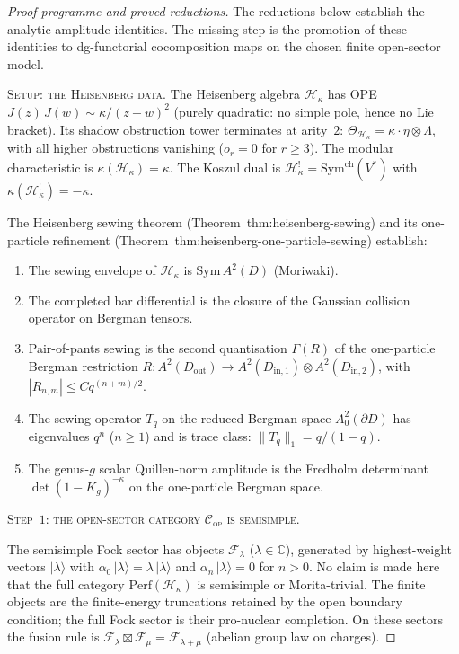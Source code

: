 \documentclass[11pt]{article}
\newcommand{\cC}{\mathcal{C}}
\newcommand{\cH}{\mathcal{H}}
\newcommand{\C}{\mathbb{C}}
\newcommand{\cF}{\mathcal{F}}
\begin{document}
\begin{proof}[Proof programme and proved reductions]
The reductions below establish the analytic amplitude identities.
The missing step is the promotion of these identities to
dg-functorial cocomposition maps on the chosen finite open-sector
model.

\medskip
\noindent\textsc{Setup: the Heisenberg data.}
The Heisenberg algebra $\cH_\kappa$ has OPE
$J(z)\,J(w) \sim \kappa/(z-w)^2$ (purely quadratic: no
simple pole, hence no Lie bracket).  Its shadow obstruction
tower terminates at arity~$2$:
$\Theta_{\cH_\kappa} = \kappa \cdot \eta \otimes \Lambda$,
with all higher obstructions vanishing ($o_r = 0$ for
$r \geq 3$).  The modular characteristic is
$\kappa(\cH_\kappa) = \kappa$.  The Koszul dual is
$\cH_\kappa^! = \mathrm{Sym}^{\mathrm{ch}}(V^*)$ with
$\kappa(\cH_\kappa^!) = -\kappa$.

The Heisenberg sewing theorem
(Theorem~\textup{thm:heisenberg-sewing}) and its
one-particle refinement
(Theorem~\textup{thm:heisenberg-one-particle-sewing})
establish:
\begin{enumerate}[label=\textup{(S\arabic*)},nosep]
\item The sewing envelope of $\cH_\kappa$ is
  $\mathrm{Sym}\, A^2(D)$ (Moriwaki).
\item The completed bar differential is the closure of the
  Gaussian collision operator on Bergman tensors.
\item Pair-of-pants sewing is the second quantisation
  $\Gamma(R)$ of the one-particle Bergman restriction
  $R \colon A^2(D_{\mathrm{out}}) \to
  A^2(D_{\mathrm{in},1}) \otimes A^2(D_{\mathrm{in},2})$,
  with $|R_{n,m}| \leq C q^{(n+m)/2}$.
\item The sewing operator $T_q$ on the reduced Bergman space
  $A^2_0(\partial D)$ has eigenvalues $q^n$ ($n \geq 1$)
  and is trace class: $\|T_q\|_1 = q/(1-q)$.
\item The genus-$g$ scalar Quillen-norm amplitude is the Fredholm
  determinant $\det(1 - K_g)^{-\kappa}$ on the one-particle
  Bergman space.
\end{enumerate}

\medskip
\noindent\textsc{Step~$1$: the open-sector category
$\cC_{\mathrm{op}}$ is semisimple.}

The semisimple Fock sector has objects $\cF_\lambda$
($\lambda \in \C$), generated by highest-weight vectors
$|\lambda\rangle$ with
$\alpha_0\,|\lambda\rangle = \lambda\,|\lambda\rangle$ and
$\alpha_n\,|\lambda\rangle = 0$ for $n > 0$.  No claim is made
here that the full category $\mathrm{Perf}(\cH_\kappa)$ is
semisimple or Morita-trivial.  The finite objects are the
finite-energy truncations retained by the open boundary condition;
the full Fock sector is their pro-nuclear completion.  On these
sectors the fusion rule is
$\cF_\lambda \boxtimes \cF_\mu = \cF_{\lambda + \mu}$
(abelian group law on charges).


\end{proof}
\end{document}
